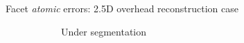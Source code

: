 \documentclass[export]{beamer}
\begin{document}
            \begin{frame}{Facet \textit{atomic} errors: 2.5D overhead reconstruction case}
                \begin{figure}
                    \begin{center}
                        \begin{subfigure}{.28\textwidth}
                            \caption{\label{fig::fac_under} Under segmentation}
                        \end{subfigure}
                        \hspace{10pt}
                        \begin{subfigure}{.28\textwidth}

\end{subfigure}
\end{center}
\end{figure}
\end{frame}
\end{document}
